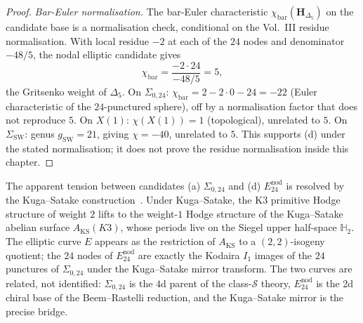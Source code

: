 \begin{proof}
\emph{Bar-Euler normalisation.} The bar-Euler characteristic
$\chi_{\mathrm{bar}}(\mathbf{H}_{\Delta_5})$ on the candidate base
is a normalisation check, conditional on the Vol.~III residue
normalisation. With local residue $-2$ at each of the $24$ nodes and
denominator $-48/5$, the nodal elliptic candidate gives
\[
\chi_{\mathrm{bar}}
=
\frac{-2\cdot24}{-48/5}
=5,
\]
the Gritsenko weight of $\Delta_5$. On $\Sigma_{0,24}$:
$\chi_{\mathrm{bar}}
= 2 - 2\cdot 0 - 24 = -22$ (Euler characteristic of the
$24$-punctured sphere), off by a normalisation factor that does not
reproduce $5$. On $X(1)$: $\chi(X(1)) = 1$ (topological), unrelated to
$5$. On $\Sigma_{\mathrm{SW}}$: genus $g_{\mathrm{SW}} = 21$, giving
$\chi = -40$, unrelated to $5$. This supports \textup{(d)} under the
stated normalisation; it does not prove the residue normalisation inside
this chapter.
\end{proof}

\begin{remark}
\label{rem:confspaces-kuga-satake-mirror}
The apparent tension between candidates \textup{(a)} $\Sigma_{0,24}$
and \textup{(d)} $E^{\mathrm{nod}}_{24}$ is resolved by the
Kuga--Satake construction~\cite{KugaSatake1967,Deligne1972}. Under
Kuga--Satake, the K3 primitive Hodge structure of weight $2$ lifts to
the weight-$1$ Hodge structure of the Kuga--Satake abelian surface
$A_{\mathrm{KS}}(K3)$, whose periods live on the Siegel upper half-space
$\mathbb{H}_2$. The elliptic curve $E$ appears as the restriction of
$A_{\mathrm{KS}}$ to a $(2,2)$-isogeny quotient; the $24$ nodes of
$E^{\mathrm{nod}}_{24}$ are exactly the Kodaira $I_1$ images of the
$24$ punctures of $\Sigma_{0,24}$ under the Kuga--Satake mirror
transform. The two curves are related, not identified: $\Sigma_{0,24}$
is the $4$d parent of the class-$\mathcal{S}$ theory,
$E^{\mathrm{nod}}_{24}$ is the $2$d chiral base of the Beem--Rastelli
reduction, and the Kuga--Satake mirror is the precise bridge.
\end{remark}

